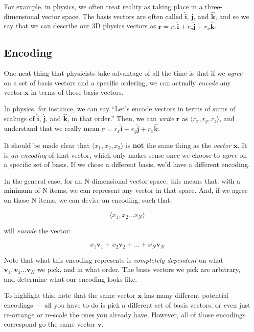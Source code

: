 \documentclass[]{article}
\begin{document}
For example, in physics, we often treat reality as taking place in a
three-dimensional vector space. The basis vectors are often called
\(\hat{\mathbf{i}}\), \(\hat{\mathbf{j}}\), and \(\hat{\mathbf{k}}\), and so we
say that we can describe our 3D physics vectors as \(\mathbf{r} = r_x
\hat{\mathbf{i}} + r_y \hat{\mathbf{j}} + r_x \hat{\mathbf{k}}\).

\subsection{Encoding}\label{encoding}

One neat thing that physicists take advantage of all the time is that if we
\emph{agree} on a set of basis vectors and a specific ordering, we can actually
\emph{encode} any vector \(\mathbf{x}\) in terms of those basis vectors.

In physics, for instance, we can say ``Let's encode vectors in terms of sums of
scalings of \(\hat{\mathbf{i}}\), \(\hat{\mathbf{j}}\), and
\(\hat{\mathbf{k}}\), in that order.'' Then, we can \emph{write} \(\mathbf{r}\)
as \(\langle r_x, r_y, r_z
\rangle\), and understand that we really mean
\(\mathbf{r} = r_x \hat{\mathbf{i}}
+ r_y \hat{\mathbf{j}} + r_x \hat{\mathbf{k}}\).

It should be made clear that \(\langle x_1, x_2, x_3 \rangle\) is \textbf{not}
the same thing as the \emph{vector} \(\mathbf{x}\). It is \emph{an encoding} of
that vector, which only makes sense once we choose to \emph{agree} on a specific
set of basis. If we chose a different basis, we'd have a different encoding.

In the general case, for an N-dimensional vector space, this means that, with a
minimum of N items, we can represent any vector in that space. And, if we agree
on those N items, we can devise an encoding, such that:

\[
\langle x_1, x_2 \dots x_N \rangle
\]

will \emph{encode} the vector:

\[
x_1 \mathbf{v}_1 + x_2 \mathbf{v}_2 + \ldots + x_N \mathbf{v}_N
\]

Note that what this encoding represents is \emph{completely dependent} on what
\(\mathbf{v}_1, \mathbf{v}_2 \ldots \mathbf{v}_N\) we pick, and in what order.
The basis vectors we pick are arbitrary, and determine what our encoding looks
like.

To highlight this, note that the same vector \(\mathbf{x}\) has many different
potential encodings --- all you have to do is pick a different set of basis
vectors, or even just re-arrange or re-scale the ones you already have. However,
all of those encodings correspond go the same vector \(\mathbf{v}\).
\end{document}
